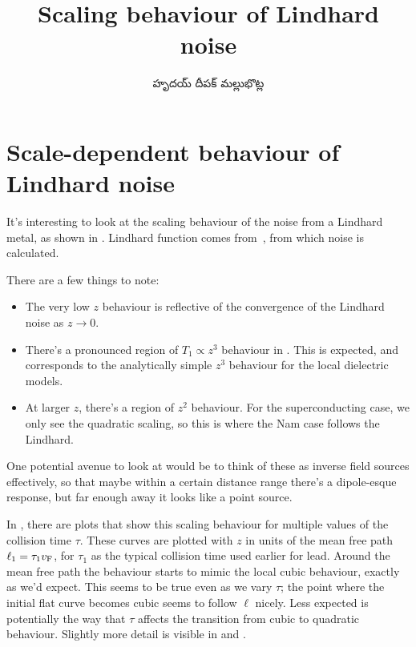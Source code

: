 \documentclass[../main.tex]{subfiles}
\title{Scaling behaviour of Lindhard noise}
\author{\begin{telugu}హృదయ్ దీపక్ మల్లుభొట్ల\end{telugu}}
\date{}
\begin{document}
	\onlyinsubfile{\maketitle}

	\section{Scale-dependent behaviour of Lindhard noise} \label{sec:lsb:intro}

	It's interesting to look at the scaling behaviour of the noise from a Lindhard metal, as shown in .
	Lindhard function comes from~\cite{SolyomV3}, from which noise is calculated.

	There are a few things to note:
	\begin{itemize}
		\item The very low $z$ behaviour is reflective of the convergence of the Lindhard noise as $z \rightarrow 0$.
		\item There's a pronounced region of $T_1 \propto z^3$ behaviour in .
			This is expected, and corresponds to the analytically simple $z^3$ behaviour for the local dielectric models.
		\item At larger $z$, there's a region of $z^2$ behaviour.
			For the superconducting case, we only see the quadratic scaling, so this is where the Nam case follows the Lindhard.
	\end{itemize}

	One potential avenue to look at would be to think of these as inverse field sources effectively, so that maybe within a certain distance range there's a dipole-esque response, but far enough away it looks like a point source.

	In , there are plots that show this scaling behaviour for multiple values of the collision time $\tau$.
	These curves are plotted with $z$ in units of the mean free path $\ell_1 = \tau_1 v_{\mathrm{F}}$, for $\tau_1$ as the typical collision time used earlier for lead.
	Around the mean free path the behaviour starts to mimic the local cubic behaviour, exactly as we'd expect.
	This seems to be true even as we vary $\tau$;
	the point where the initial flat curve becomes cubic seems to follow $\ell$ nicely.
	Less expected is potentially the way that $\tau$ affects the transition from cubic to quadratic behaviour. 
	Slightly more detail is visible in  and .
\end{document}
